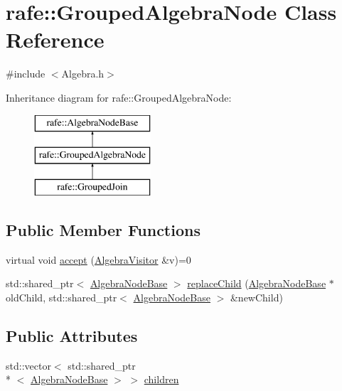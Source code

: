 \hypertarget{classrafe_1_1_grouped_algebra_node}{\section{rafe\+:\+:Grouped\+Algebra\+Node Class Reference}
\label{classrafe_1_1_grouped_algebra_node}
}


{\ttfamily \#include $<$Algebra.\+h$>$}

Inheritance diagram for rafe\+:\+:Grouped\+Algebra\+Node\+:\begin{figure}[H]
\begin{center}
\leavevmode
\includegraphics[height=3.000000cm]{classrafe_1_1_grouped_algebra_node}
\end{center}
\end{figure}
\subsection*{Public Member Functions}
\begin{DoxyCompactItemize}
\item 
virtual void \hyperlink{classrafe_1_1_grouped_algebra_node_abdb48442900d5560f815f4eb33ebeb04}{accept} (\hyperlink{classrafe_1_1_algebra_visitor}{Algebra\+Visitor} \&v)=0
\item 
std\+::shared\+\_\+ptr$<$ \hyperlink{classrafe_1_1_algebra_node_base}{Algebra\+Node\+Base} $>$ \hyperlink{classrafe_1_1_grouped_algebra_node_a3e19a9a32840f4deebec342963955634}{replace\+Child} (\hyperlink{classrafe_1_1_algebra_node_base}{Algebra\+Node\+Base} $\ast$old\+Child, std\+::shared\+\_\+ptr$<$ \hyperlink{classrafe_1_1_algebra_node_base}{Algebra\+Node\+Base} $>$ \&new\+Child)
\end{DoxyCompactItemize}
\subsection*{Public Attributes}
\begin{DoxyCompactItemize}
\item 
std\+::vector$<$ std\+::shared\+\_\+ptr\\*
$<$ \hyperlink{classrafe_1_1_algebra_node_base}{Algebra\+Node\+Base} $>$ $>$ \hyperlink{classrafe_1_1_grouped_algebra_node_ad7fdddb444ed50c118cece4fc1dd6783}{children}
\end{DoxyCompactItemize}


